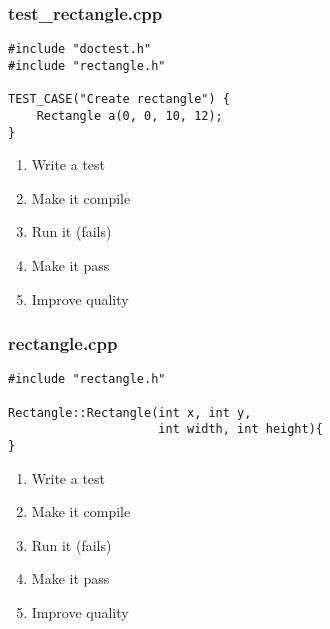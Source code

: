 \begin{frame}[fragile]
\frametitle{test\_rectangle.cpp}
\begin{minipage}[t]{0.48\linewidth}
\begin{lstlisting}
#include "doctest.h"
#include "rectangle.h"

TEST_CASE("Create rectangle") {
    Rectangle a(0, 0, 10, 12);
}
\end{lstlisting}
\end{minipage}\hfill
\begin{minipage}[t]{0.28\linewidth}
  \small
  \begin{enumerate} 
    \item \textcolor{deadcolor}{Write a test}
    \item \textcolor{activecolor}{Make it compile}
    \item \textcolor{deadcolor}{Run it (fails)}
    \item \textcolor{deadcolor}{Make it pass}
    \item \textcolor{deadcolor}{Improve quality}
  \end{enumerate} 
\end{minipage}
\end{frame}


\begin{frame}[fragile]
\frametitle{rectangle.cpp}
\begin{minipage}[t]{0.48\linewidth}
\begin{lstlisting}
#include "rectangle.h"

Rectangle::Rectangle(int x, int y, 
                     int width, int height){
}
\end{lstlisting}
\end{minipage}\hfill
\begin{minipage}[t]{0.28\linewidth}
  \small
  \begin{enumerate} 
    \item \textcolor{deadcolor}{Write a test}
    \item \textcolor{activecolor}{Make it compile}
    \item \textcolor{deadcolor}{Run it (fails)}
    \item \textcolor{deadcolor}{Make it pass}
    \item \textcolor{deadcolor}{Improve quality}
  \end{enumerate} 
\end{minipage}
\end{frame}

